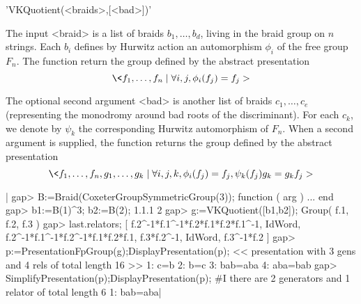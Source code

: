 
'VKQuotient(<braids>,[<bad>])'

The input  <braid> is a  list of  braids $b_1,\dots,b_d$, living  in the
braid group  on $n$ strings.  Each $b_i$  defines by Hurwitz  action an
automorphism $\phi_i$ of  the free group $F_n$. The  function return the
group  defined by  the abstract  presentation\: $$\<  f_1,\dots,f_n \mid
\forall i,j, \phi_i(f_j)=f_j > $$

The  optional   second  argument  <bad>   is  another  list   of  braids
$c_1,\dots,c_e$  (representing the  monodromy  around bad  roots of  the
discriminant). For each  $c_k$, we denote by  $\psi_k$ the corresponding
Hurwitz automorphism of  $F_n$. When a second argument  is supplied, the
function  returns  the  group  defined by  the  abstract  presentation\:
$$\<  f_1,\dots,f_n,g_1,\dots,g_k \mid  \forall i,j,k,  \phi_i(f_j)=f_j,
\psi_k(f_j) g_k=g_k f_j > $$


|    gap> B:=Braid(CoxeterGroupSymmetricGroup(3));
    function ( arg ) ... end
    gap> b1:=B(1)^3; b2:=B(2);                   
    1.1.1
    2
    gap> g:=VKQuotient([b1,b2]);                 
    Group( f.1, f.2, f.3 )
    gap>  last.relators;  
    [ f.2^-1*f.1^-1*f.2*f.1*f.2*f.1^-1, IdWord,
      f.2^-1*f.1^-1*f.2^-1*f.1*f.2*f.1, f.3*f.2^-1, IdWord, f.3^-1*f.2 ]
    gap> p:=PresentationFpGroup(g);DisplayPresentation(p);
    << presentation with 3 gens and 4 rels of total length 16 >>
    1: c=b
    2: b=c
    3: bab=aba
    4: aba=bab
    gap> SimplifyPresentation(p);DisplayPresentation(p);
    #I  there are 2 generators and 1 relator of total length 6
    1: bab=aba|
